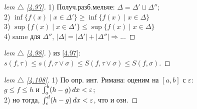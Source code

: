 
\begin{minipage}[t]{0.45\textwidth}
\begin{proof}[
lem $\triangle$
\eqref{4.97}]

\phantom{42}
\noindent

1) Получ.разб.мельче: $\Delta = \Delta' \sqcup \Delta''$;\\
2) $\inf\{f(x) \mid x \in \Delta' \} \geq \inf \{ f(x) \mid x \in \Delta \}$\\
3) $\sup\{f(x) \mid x \in \Delta' \} \leq \sup \{ f(x) \mid x \in \Delta \}$\\
4) same для $\Delta''$, $|\Delta| = |\Delta'| + |\Delta''| \Rightarrow...$
\end{proof}


\begin{proof}[
 lem $\triangle$
\eqref{4.98}]

\phantom{42}
) из \eqref{4.97}:\\ $s(f,\tau) \leq s(f,\tau \vee \sigma) \leq S(f,\tau \vee \sigma) \leq S(f,\sigma).$
\end{proof}


\begin{proof}[
 lem $\triangle$
\eqref{4.108}]

\phantom{42}
\noindent

1) По опр. инт. Римана: оценим на $[a,b]$ с $\varepsilon$:\\$g\leq f\leq h$ и $\int_a^b (h - g) \, d x < \varepsilon$;\\
2) но тогда, $\int_c^d (h - g) \, d x < \varepsilon$, что и озн. 

\end{proof}




\end{minipage}
\hfill
